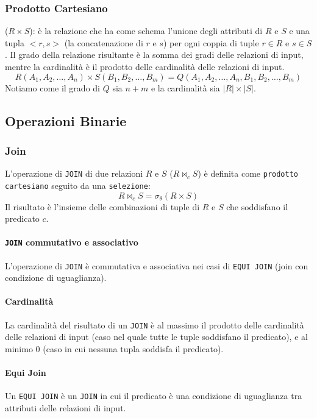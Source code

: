         \subsubsection{Prodotto Cartesiano} ($ R \times S $): è la relazione che ha come schema l'unione degli attributi di $ R $ e $ S $ e una tupla $ <r,s> $ (la concatenazione di $ r $ e $ s $) per ogni coppia di tuple $ r \in R $ e $ s \in S $. Il grado della relazione risultante è la somma dei gradi delle relazioni di input, mentre la cardinalità è il prodotto delle cardinalità delle relazioni di input. 
        $$
            R(A_1, A_2, \dots, A_n) \times S(B_1, B_2, \dots, B_m) = Q(A_1, A_2, \dots, A_n, B_1, B_2, \dots, B_m)
        $$
        Notiamo come il grado di $ Q $ sia $ n + m $ e la cardinalità sia $ |R| \times |S| $.
    \subsection{Operazioni Binarie}    
        \subsubsection{Join}
            L'operazione di \texttt{JOIN} di due relazioni $ R $ e $ S $ ($ R \Join_c S $) è definita come \texttt{prodotto cartesiano} seguito da una \texttt{selezione}:
            $$
                R \Join_c S = \sigma_{\theta} (R \times S)
            $$
            Il risultato è l'insieme delle combinazioni di tuple di $ R $ e $ S $ che soddisfano il predicato $ c $. 
            \paragraph{\texttt{JOIN} commutativo e associativo} L'operazione di \texttt{JOIN} è commutativa e associativa nei casi di \texttt{EQUI JOIN} (join con condizione di uguaglianza).
            \paragraph{Cardinalità} La cardinalità del risultato di un \texttt{JOIN} è al massimo il prodotto delle cardinalità delle relazioni di input (caso nel quale tutte le tuple soddisfano il predicato), e al minimo 0 (caso in cui nessuna tupla soddisfa il predicato).
            \paragraph{Equi Join} Un \texttt{EQUI JOIN} è un \texttt{JOIN} in cui il predicato è una condizione di uguaglianza tra attributi delle relazioni di input.
